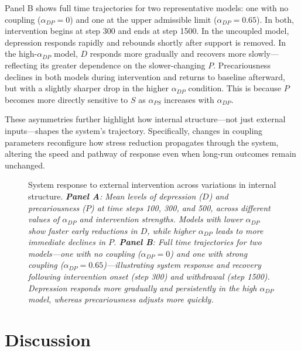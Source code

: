 \documentclass[
]{article}
\begin{document}
Panel B shows full time trajectories for two representative models: one
with no coupling (\(\alpha_{DP} = 0\)) and one at the upper admissible
limit (\(\alpha_{DP} = 0.65\)). In both, intervention begins at step 300
and ends at step 1500. In the uncoupled model, depression responds
rapidly and rebounds shortly after support is removed. In the
high-\(\alpha_{DP}\) model, \(D\) responds more gradually and recovers
more slowly---reflecting its greater dependence on the slower-changing
\(P\). Precariousness declines in both models during intervention and
returns to baseline afterward, but with a slightly sharper drop in the
higher \(\alpha_{DP}\) condition. This is because \(P\) becomes more
directly sensitive to \(S\) as \(\alpha_{PS}\) increases with
\(\alpha_{DP}\).

These asymmetries further highlight how internal structure---not just
external inputs---shapes the system's trajectory. Specifically, changes
in coupling parameters reconfigure how stress reduction propagates
through the system, altering the speed and pathway of response even when
long-run outcomes remain unchanged.

\begin{figure}


\caption{\label{fig-intervention}System response to external
intervention across variations in internal structure.
\emph{\textbf{Panel A}: Mean levels of depression (\(D\)) and
precariousness (\(P\)) at time steps 100, 300, and 500, across different
values of \(\alpha_{DP}\) and intervention strengths. Models with lower
\(\alpha_{DP}\) show faster early reductions in \(D\), while higher
\(\alpha_{DP}\) leads to more immediate declines in \(P\). \textbf{Panel
B}: Full time trajectories for two models---one with no coupling
(\(\alpha_{DP} = 0\)) and one with strong coupling
(\(\alpha_{DP} = 0.65\))---illustrating system response and recovery
following intervention onset (step 300) and withdrawal (step 1500).
Depression responds more gradually and persistently in the high
\(\alpha_{DP}\) model, whereas precariousness adjusts more quickly.}}

\end{figure}%

\section{Discussion}\label{discussion}
\end{document}
